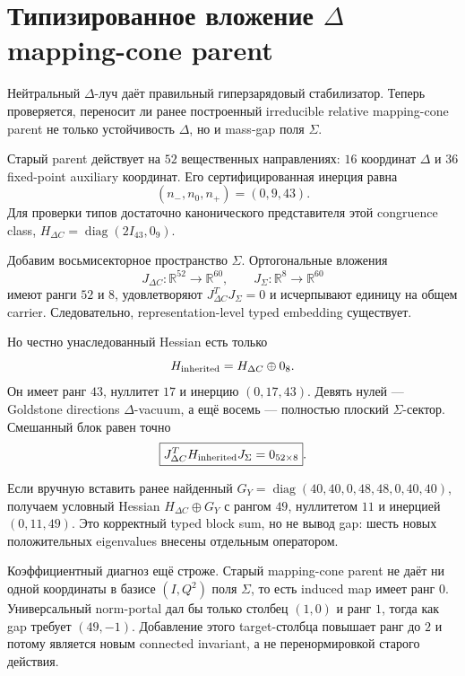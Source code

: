 \chapter{Типизированное вложение
\texorpdfstring{$\Delta$}{Delta} mapping-cone parent}
\label{ch:v10-h15-r2-delta-mapping-cone-embedding}

Нейтральный $\Delta$-луч даёт правильный гиперзарядовый стабилизатор.
Теперь проверяется, переносит ли ранее построенный irreducible relative
mapping-cone parent не только устойчивость $\Delta$, но и mass-gap поля
$\Sigma$.

Старый parent действует на $52$ вещественных направлениях: $16$ координат
$\Delta$ и $36$ fixed-point auxiliary координат. Его сертифицированная
инерция равна
\begin{equation}
 (n_-,n_0,n_+)=(0,9,43).
\end{equation}
Для проверки типов достаточно канонического представителя этой congruence
class, $H_{\Delta C}=\operatorname{diag}(2I_{43},0_9)$.

Добавим восьмисекторное пространство $\Sigma$. Ортогональные вложения
\begin{equation}
 J_{\Delta C}:\mathbb R^{52}\longrightarrow\mathbb R^{60},
 \qquad
 J_\Sigma:\mathbb R^8\longrightarrow\mathbb R^{60}
\end{equation}
имеют ранги $52$ и $8$, удовлетворяют
$J_{\Delta C}^TJ_\Sigma=0$ и исчерпывают единицу на общем carrier.
Следовательно, representation-level typed embedding существует.

Но честно унаследованный Hessian есть только
\begin{equation}
 H_{\rm inherited}=H_{\Delta C}\oplus0_8.
\end{equation}
Он имеет ранг $43$, нуллитет $17$ и инерцию $(0,17,43)$. Девять нулей ---
Goldstone directions $\Delta$-vacuum, а ещё восемь --- полностью плоский
$\Sigma$-сектор. Смешанный блок равен точно
\begin{equation}
 \boxed{J_{\Delta C}^TH_{\rm inherited}J_\Sigma=0_{52\times8}}.
\end{equation}

Если вручную вставить ранее найденный
$G_Y=\operatorname{diag}(40,40,0,48,48,0,40,40)$, получаем условный
Hessian $H_{\Delta C}\oplus G_Y$ с рангом $49$, нуллитетом $11$ и
инерцией $(0,11,49)$. Это корректный typed block sum, но не вывод gap:
шесть новых положительных eigenvalues внесены отдельным оператором.

Коэффициентный диагноз ещё строже. Старый mapping-cone parent не даёт ни
одной координаты в базисе $(I,Q^2)$ поля $\Sigma$, то есть induced map
имеет ранг $0$. Универсальный norm-portal дал бы только столбец $(1,0)$ и
ранг $1$, тогда как gap требует $(49,-1)$. Добавление этого target-столбца
повышает ранг до $2$ и потому является новым connected invariant, а не
перенормировкой старого действия.

